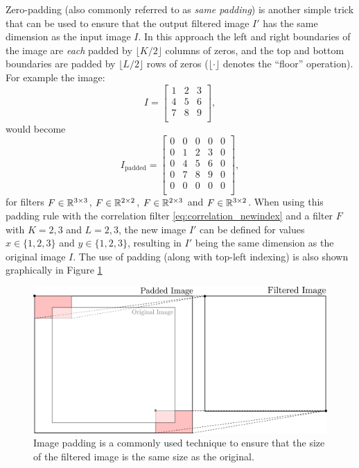 \begin{example}
Zero-padding (also commonly referred to as \textit{same padding}) is another simple trick that can be used to ensure that the output filtered image $I'$ has the same dimension as the input image $I$. In this approach the left and right boundaries of the image are \textit{each} padded by $\lfloor K/2 \rfloor$ columns of zeros, and the top and bottom boundaries are padded by $\lfloor L/2 \rfloor$ rows of zeros ($\lfloor \cdot \rfloor$ denotes the ``floor'' operation). For example the image:
\begin{equation*}
I = \begin{bmatrix}
    1 & 2 & 3 \\
    4 & 5 & 6 \\
    7 & 8 & 9 \\
    \end{bmatrix},
\end{equation*}
would become
\begin{equation*}
I_\text{padded} = \begin{bmatrix}
    0 & 0 & 0 & 0 & 0 \\
    0 & 1 & 2 & 3 & 0 \\
    0 & 4 & 5 & 6 & 0 \\
    0 & 7 & 8 & 9 & 0 \\
    0 & 0 & 0 & 0 & 0 \\
    \end{bmatrix},
\end{equation*}
for filters $F \in \mathbb{R}^{3\times 3}$, $F \in \mathbb{R}^{2 \times 2}$, $F \in \mathbb{R}^{2 \times 3}$ and $F \in \mathbb{R}^{3 \times 2}$. When using this padding rule with the correlation filter \eqref{eq:correlation_newindex} and a filter $F$ with $K = 2,3$ and $L= 2,3$, the new image $I'$ can be defined for values $x \in \{1,2,3\}$ and $y \in \{1,2,3\}$, resulting in $I'$ being the same dimension as the original image $I$. The use of padding (along with top-left indexing) is also shown graphically in Figure \ref{fig:paddingfilter}
\begin{figure}[ht]
  \centering
  \includegraphics[width=.7\textwidth]{tex/figs/ch10_figs/topleftfilter_padding.png}
    \caption{Image padding is a commonly used technique to ensure that the size of the filtered image is the same size as the original.}
    \label{fig:paddingfilter}
\end{figure}
\end{example}


